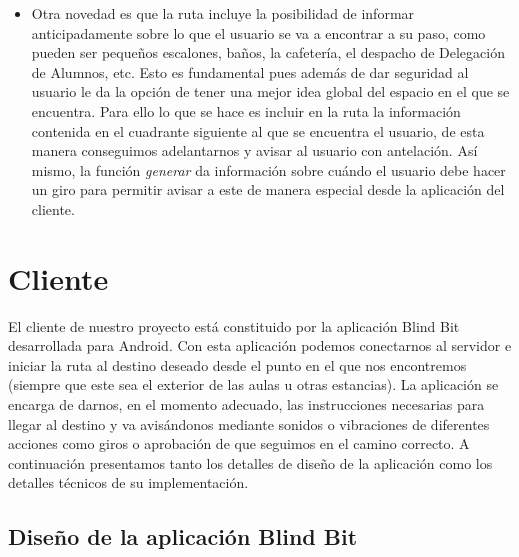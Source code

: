 \begin{itemize}
	\item Otra novedad es que la ruta incluye la posibilidad de informar anticipadamente sobre lo que el usuario se va a encontrar a su paso, como pueden ser pequeños escalones, baños, la cafetería, el despacho de Delegación de Alumnos, etc. Esto es fundamental pues además de dar seguridad al usuario le da la opción de tener una mejor idea global del espacio en el que se encuentra. Para ello lo que se hace es incluir en la ruta la información contenida en el cuadrante siguiente al que se encuentra el usuario, de esta manera conseguimos adelantarnos y avisar al usuario con antelación. Así mismo, la función \textit{generar} da información sobre cuándo el usuario debe hacer un giro para permitir avisar a este de manera especial desde la aplicación del cliente.
	
\end{itemize}





\section{Cliente}

El cliente de nuestro proyecto está constituido por la aplicación Blind Bit desarrollada para Android. Con esta aplicación podemos conectarnos al servidor e iniciar la ruta al destino deseado desde el punto en el que nos encontremos (siempre que este sea el exterior de las aulas u otras estancias). La aplicación se encarga de darnos, en el momento adecuado, las instrucciones necesarias para llegar al destino y va avisándonos mediante sonidos o vibraciones de diferentes acciones como giros o aprobación de que seguimos en el camino correcto. A continuación presentamos tanto los detalles de diseño de la aplicación como los detalles técnicos de su implementación. 


\subsection{Diseño de la aplicación Blind Bit}


